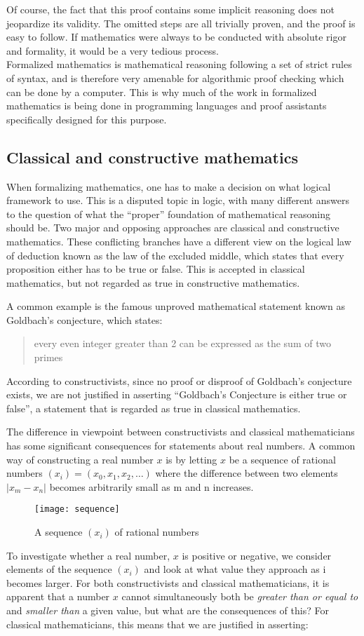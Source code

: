 \documentclass[11pt,a4paper]{article}
\begin{document}
Of course, the fact that this proof contains some implicit reasoning does not jeopardize its validity. The omitted steps are all trivially proven, and the proof is easy to follow. If mathematics were always to be conducted with absolute rigor and formality, it would be a very tedious process.\\

Formalized mathematics is mathematical reasoning following a set of strict rules of syntax, and is therefore very amenable for algorithmic proof checking which can be done by a computer. This is why much of the work in formalized mathematics is being done in programming languages and proof assistants specifically designed for this purpose.\\

\subsection{Classical and constructive mathematics}
When formalizing mathematics, one has to make a decision on what logical framework to use. This is a disputed topic in logic, with many different answers to the question of what the ``proper'' foundation of mathematical reasoning should be. Two major and opposing approaches are classical and constructive mathematics. These conflicting branches have a different view on the logical law of deduction known as the law of the excluded middle, which states that every proposition either has to be true or false. This is accepted in classical mathematics, but not regarded as true in constructive mathematics.

A common example is the famous unproved mathematical statement known as Goldbach's conjecture, which states: \blockquote{every even integer greater than 2 can be expressed as the sum of two primes}. According to constructivists, since no proof or disproof of Goldbach's conjecture exists, we are not justified in asserting ``Goldbach's Conjecture is either true or false'', a statement that is regarded as true in classical mathematics.

The difference in viewpoint between constructivists and classical mathematicians has some significant consequences for statements about real numbers. A common way of constructing a real number $x$ is by letting $x$ be a sequence of rational numbers $(x_i) = (x_0, x_1, x_2, \dots)$ where the difference between two elements $|x_m - x_n|$ becomes arbitrarily small as m and n increases.\\
\begin{figure}[H]
  \texttt{[image: sequence]}
  \caption{A sequence $(x_i)$ of rational numbers}
\end{figure}
To investigate whether a real number, $x$ is positive or negative, we consider elements of the sequence $(x_i)$ and look at what value they approach as i becomes larger. For both constructivists and classical mathematicians, it is apparent that a number $x$ cannot simultaneously both be \textit{greater than or equal to} and \textit{smaller than} a given value, but what are the consequences of this? For classical mathematicians, this means that we are justified in asserting:
\end{document}

